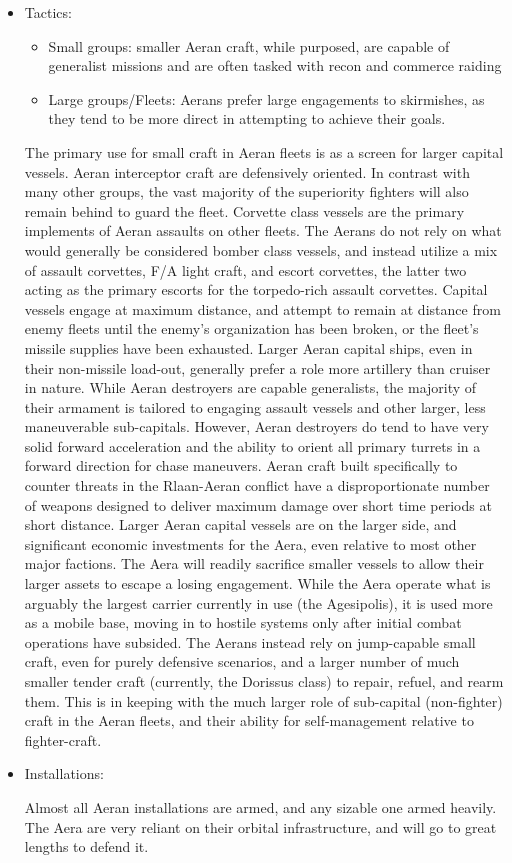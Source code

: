 \begin{itemize}
\item Tactics:
\begin{itemize}
\item    Small groups: smaller Aeran craft, while purposed, are capable of generalist missions and are often tasked with recon and commerce raiding 
\item    Large groups/Fleets: Aerans prefer large engagements to skirmishes, as they tend to be more direct in attempting to achieve their goals. 
\end{itemize}

The primary use for small craft in Aeran fleets is as a screen for
larger capital vessels. Aeran interceptor craft are defensively
oriented. In contrast with many other groups, the vast majority of the
superiority fighters will also remain behind to guard the
fleet. Corvette class vessels are the primary implements of Aeran
assaults on other fleets. The Aerans do not rely on what would
generally be considered bomber class vessels, and instead utilize a
mix of assault corvettes, F/A light craft, and escort corvettes, the
latter two acting as the primary escorts for the torpedo-rich assault
corvettes. Capital vessels engage at maximum distance, and attempt to
remain at distance from enemy fleets until the enemy's organization
has been broken, or the fleet's missile supplies have been
exhausted. Larger Aeran capital ships, even in their non-missile
load-out, generally prefer a role more artillery than cruiser in
nature. While Aeran destroyers are capable generalists, the majority
of their armament is tailored to engaging assault vessels and other
larger, less maneuverable sub-capitals. However, Aeran destroyers do
tend to have very solid forward acceleration and the ability to orient
all primary turrets in a forward direction for chase maneuvers. Aeran
craft built specifically to counter threats in the Rlaan-Aeran
conflict have a disproportionate number of weapons designed to deliver
maximum damage over short time periods at short distance. Larger Aeran
capital vessels are on the larger side, and significant economic
investments for the Aera, even relative to most other major
factions. The Aera will readily sacrifice smaller vessels to allow
their larger assets to escape a losing engagement. While the Aera
operate what is arguably the largest carrier currently in use (the
Agesipolis), it is used more as a mobile base, moving in to hostile
systems only after initial combat operations have subsided. The Aerans
instead rely on jump-capable small craft, even for purely defensive
scenarios, and a larger number of much smaller tender craft
(currently, the Dorissus class) to repair, refuel, and rearm
them. This is in keeping with the much larger role of sub-capital
(non-fighter) craft in the Aeran fleets, and their ability for
self-management relative to fighter-craft.

\item Installations:

Almost all Aeran installations are armed, and any sizable one armed
heavily. The Aera are very reliant on their orbital infrastructure,
and will go to great lengths to defend it.

\end{itemize}

